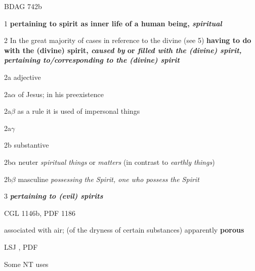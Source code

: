 				\begin{compactdesc}
					\item[BDAG 742b] \textbf{}
						\begin{compactitem}
							\item[1] \textbf{pertaining to spirit as inner life of a human being, \textit{spiritual}}
							\item[2] In the great majority of cases in reference to the divine \gr{πνεῦμα} (see  5) \textbf{having to do with the (divine) spirit, \textit{caused by} or \textit{filled with the (divine) spirit, pertaining to/corresponding to the (divine) spirit}}
							\item[2a] adjective
							\item[2a$\alpha$] of Jesus; in his preexistence
							\item[2a$\beta$] as a rule it is used of impersonal things
							\item[2a$\gamma$] 
							\item[2b] substantive
							\item[2b$\alpha$] neuter  \textit{spiritual things} or \textit{matters} (in contrast to  \textit{earthly things})
							\item[2b$\beta$] masculine  \textit{possessing the Spirit, one who possess the Spirit}
							\item[3] \textbf{\textit{pertaining to (evil) spirits}}
						\end{compactitem}
					\item[CGL 1146b, PDF 1186] \textbf{}
						\begin{compactitem}
							\item associated with air; (of the dryness of certain substances) apparently \textbf{porous}
						\end{compactitem}
					\item[LSJ , PDF ] \textbf{}
						\begin{compactitem}
							\item 
						\end{compactitem}
				\end{compactdesc}
				
				\begin{compactdesc}
					\item[Some NT uses] \textbf{}
						\begin{compactdesc}
							\item[]
						\end{compactdesc}
				\end{compactdesc}
		
